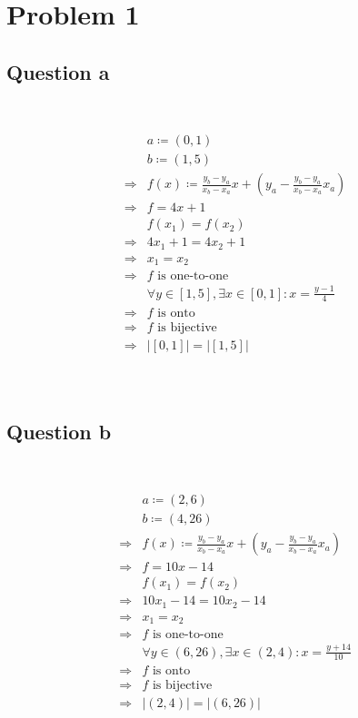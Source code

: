 \documentclass{article}
\begin{document}
\section*{Problem 1}

\subsection*{Question a}

~

\begin{equation*}
    \begin{split}
        &a\coloneqq (0,1)\\
        &b\coloneqq (1,5)\\
        \Rightarrow &f(x)\coloneqq \frac{y_b-y_a}{x_b-x_a}x+(y_a-\frac{y_b-y_a}{x_b-x_a} x_a)\\
        \Rightarrow &f=4x+1\\
        &f(x_1)=f(x_2)\\
        \Rightarrow &4x_1+1=4x_2+1\\
        \Rightarrow &x_1=x_2\\
        \Rightarrow &f\text{ is one-to-one}\\
        &\forall y\in[1,5],\exists x\in[0,1]:x=\frac{y-1}{4}\\
        \Rightarrow &f\text{ is onto}\\
        \Rightarrow &f \text{ is bijective}\\
        \Rightarrow &|[0,1]|=|[1,5]|\\
    \end{split}
\end{equation*}

~

\subsection*{Question b}

~

\begin{equation*}
    \begin{split}
        &a\coloneqq (2,6)\\
        &b\coloneqq (4,26)\\
        \Rightarrow &f(x)\coloneqq \frac{y_b-y_a}{x_b-x_a}x+(y_a-\frac{y_b-y_a}{x_b-x_a} x_a)\\
        \Rightarrow &f=10x-14\\
        &f(x_1)=f(x_2)\\
        \Rightarrow &10x_1-14=10x_2-14\\
        \Rightarrow &x_1=x_2\\
        \Rightarrow &f\text{ is one-to-one}\\
        &\forall y\in(6,26),\exists x\in(2,4):x=\frac{y+14}{10}\\
        \Rightarrow &f\text{ is onto}\\
        \Rightarrow &f \text{ is bijective}\\
        \Rightarrow &|(2,4)|=|(6,26)|\\
    \end{split}
\end{equation*}
\end{document}
